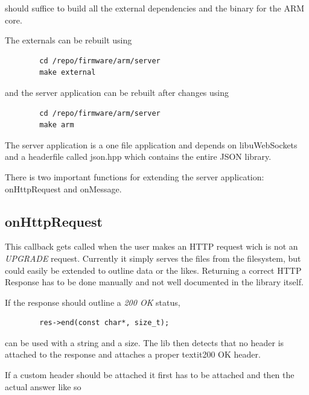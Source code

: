 should suffice to build all the external dependencies and the binary for the ARM core.

The externals can be rebuilt using

\begin{listing}
    \begin{verbatim}
        cd /repo/firmware/arm/server
        make external
    \end{verbatim}
\end{listing}

and the server application can be rebuilt after changes using

\begin{listing}
    \begin{verbatim}
        cd /repo/firmware/arm/server
        make arm
    \end{verbatim}
\end{listing}

The server application is a one file application and depends on libuWebSockets\cite{TODO:} and a headerfile called json.hpp\cite{TODO:} which contains the entire JSON library.

There is two important functions for extending the server application: onHttpRequest and onMessage.

\subsection{onHttpRequest}

This callback gets called when the user makes an HTTP request wich is not an \textit{UPGRADE} request. Currently it simply serves the files from the filesystem, but could easily be extended to outline data or the likes.
Returning a correct HTTP Response has to be done manually and not well documented in the library itself.

If the response should outline a \textit{200 OK} status,

\begin{listing}
    \begin{verbatim}
        res->end(const char*, size_t);
    \end{verbatim}
\end{listing}

can be used with a string and a size. The lib then detects that no header is attached to the response and attaches a proper textit{200 OK} header.

If a custom header should be attached it first has to be attached and then the actual answer like so

